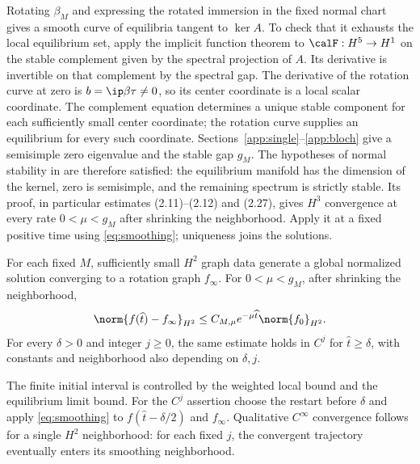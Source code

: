 Rotating $\beta_M$ and expressing the rotated immersion in the fixed normal chart gives a smooth curve of equilibria tangent to $\ker A$. To check that it exhausts the local equilibrium set, apply the implicit function theorem to $\calF:H^5\to H^1$ on the stable complement given by the spectral projection of $A$. Its derivative is invertible on that complement by the spectral gap. The derivative of the rotation curve at zero is $b=\ip\beta\tau\ne0$, so its center coordinate is a local scalar coordinate. The complement equation determines a unique stable component for each sufficiently small center coordinate; the rotation curve supplies an equilibrium for every such coordinate. Sections~\ref{app:single}--\ref{app:bloch} give a semisimple zero eigenvalue and the stable gap $g_M$. The hypotheses of normal stability in \cite[Theorem~2.1]{PSZ} are therefore satisfied: the equilibrium manifold has the dimension of the kernel, zero is semisimple, and the remaining spectrum is strictly stable. Its proof, in particular estimates (2.11)--(2.12) and (2.27), gives $H^3$ convergence at every rate $0<\mu<g_M$ after shrinking the neighborhood. Apply it at a fixed positive time using \eqref{eq:smoothing}; uniqueness joins the solutions.

\begin{proposition}\label{prop:H2}
For each fixed $M$, sufficiently small $H^2$ graph data generate a global normalized solution converging to a rotation graph $f_\infty$. For $0<\mu<g_M$, after shrinking the neighborhood,
\begin{equation}\label{eq:H2-decay}
 \norm{f(\widehat t)-f_\infty}_{H^2}\le C_{M,\mu}e^{-\mu\widehat t}\norm{f_0}_{H^2}.
\end{equation}
For every $\delta>0$ and integer $j\ge0$, the same estimate holds in $C^j$ for $\widehat t\ge\delta$, with constants and neighborhood also depending on $\delta,j$.
\end{proposition}
The finite initial interval is controlled by the weighted local bound and the equilibrium limit bound. For the $C^j$ assertion choose the restart before $\delta$ and apply \eqref{eq:smoothing} to $f(\widehat t-\delta/2)$ and $f_\infty$. Qualitative $C^\infty$ convergence follows for a single $H^2$ neighborhood: for each fixed $j$, the convergent trajectory eventually enters its smoothing neighborhood.
